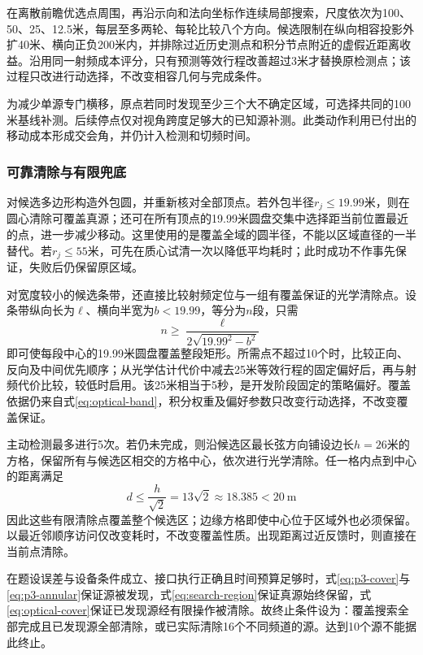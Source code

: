 \documentclass{JXUSTmodeling}
\begin{document}
在离散前瞻优选点周围，再沿示向和法向坐标作连续局部搜索，尺度依次为100、50、25、12.5米，每层至多两轮、每轮比较八个方向。候选限制在纵向相容投影外扩40米、横向正负200米内，并排除过近历史测点和积分节点附近的虚假近距离收益。沿用同一射频成本评分，只有预测等效行程改善超过3米才替换原检测点；该过程只改进行动选择，不改变相容几何与完成条件。

为减少单源专门横移，原点若同时发现至少三个大不确定区域，可选择共同的100米基线补测。后续停点仅对视角跨度足够大的已知源补测。此类动作利用已付出的移动成本形成交会角，并仍计入检测和切频时间。

\subsubsection{可靠清除与有限兜底}
对候选多边形构造外包圆，并重新核对全部顶点。若外包半径$r_j\le19.99$米，则在圆心清除可覆盖真源；还可在所有顶点的19.99米圆盘交集中选择距当前位置最近的点，进一步减少移动。这里使用的是覆盖全域的圆半径，不能以区域直径的一半替代。若$r_j\le55$米，可先在质心试清一次以降低平均耗时；此时成功不作事先保证，失败后仍保留原区域。

对宽度较小的候选条带，还直接比较射频定位与一组有覆盖保证的光学清除点。设条带纵向长为$\ell$、横向半宽为$b<19.99$，等分为$n$段，只需
\begin{equation}
 n\ge\frac{\ell}{2\sqrt{19.99^2-b^2}}
 \label{eq:optical-band}
\end{equation}
即可使每段中心的19.99米圆盘覆盖整段矩形。所需点不超过10个时，比较正向、反向及中间优先顺序；从光学估计代价中减去25米等效行程的固定偏好后，再与射频代价比较，较低时启用。该25米相当于5秒，是开发阶段固定的策略偏好。覆盖依据仍来自式\eqref{eq:optical-band}，积分权重及偏好参数只改变行动选择，不改变覆盖保证。

主动检测最多进行5次。若仍未完成，则沿候选区最长弦方向铺设边长$h=26$米的方格，保留所有与候选区相交的方格中心，依次进行光学清除。任一格内点到中心的距离满足
\begin{equation}
 d\le\frac{h}{\sqrt2}=13\sqrt2\approx18.385<20\ \mathrm{m}
 \label{eq:optical-cover}
\end{equation}
因此这些有限清除点覆盖整个候选区；边缘方格即使中心位于区域外也必须保留。以最近邻顺序访问仅改变耗时，不改变覆盖性质。出现距离过近反馈时，则直接在当前点清除。

在题设误差与设备条件成立、接口执行正确且时间预算足够时，式\eqref{eq:p3-cover}与\eqref{eq:p3-annular}保证源被发现，式\eqref{eq:search-region}保证真源始终保留，式\eqref{eq:optical-cover}保证已发现源经有限操作被清除。故终止条件设为：覆盖搜索全部完成且已发现源全部清除，或已实际清除16个不同频道的源。达到10个源不能据此终止。
\end{document}
